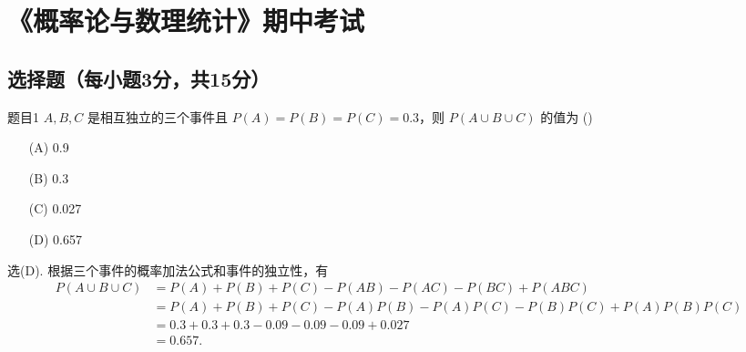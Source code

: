 \section{《概率论与数理统计》期中考试}

\subsection{选择题（每小题3分，共15分）}

\begin{question}{题目1}
    $A, B, C$ 是相互独立的三个事件且 $P(A) = P(B) = P(C) = 0.3$，则 $P(A \cup B \cup C)$ 的值为 (\quad \quad)
    \begin{multicols}{4}
        \begin{itemize}
            \item [(A)] 0.9
            \item [(B)] 0.3
            \item [(C)] 0.027
            \item [(D)] 0.657
        \end{itemize}
    \end{multicols}
\end{question}
\begin{solution}
    选(D).  根据三个事件的概率加法公式和事件的独立性，有
    $$
        \begin{aligned}
            P(A \cup B \cup C)
             & = P(A) + P(B) + P(C) - P(AB) - P(AC) - P(BC) + P(ABC)                \\
             & = P(A) + P(B) + P(C) - P(A)P(B) - P(A)P(C) - P(B)P(C) + P(A)P(B)P(C) \\
             & = 0.3 + 0.3 + 0.3 - 0.09 - 0.09 - 0.09 + 0.027                       \\
             & = 0.657.                                                             \\
        \end{aligned}
    $$
\end{solution}


